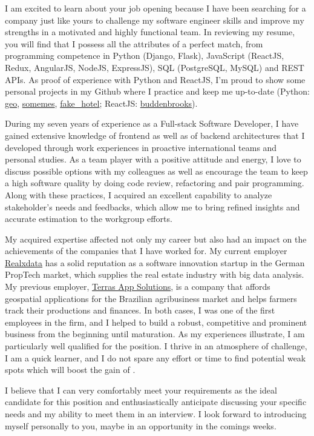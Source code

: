 I am excited to learn about your job opening because I have been searching for a
company just like yours to challenge my software engineer skills and improve my
strengths in a motivated and highly functional team. In reviewing my resume,
you will find that I possess all the attributes of a perfect match, from programming
competence in Python (Django, Flask), JavaScript (ReactJS, Redux, AngularJS, NodeJS, ExpressJS), SQL
(PostgreSQL, MySQL) and REST APIs. As proof of experience with Python and ReactJS,
I'm proud to show some personal projects in my Github where I practice and keep
me up-to-date (Python: \href{https://github.com/joaosr/geo}{geo}, \href{https://github.com/joaosr/somemes/tree/target}{somemes},
\href{https://github.com/joaosr/fake_hotel}{fake\_hotel}; ReactJS: \href{https://github.com/joaosr/buddenbrooks}{buddenbrooks}).

During my seven years of experience as a Full-stack Software Developer, I have
gained extensive knowledge of frontend as well as of backend architectures that
I developed through work experiences in proactive international teams and personal
studies. As a team player with a positive attitude and energy, I love to discuss
possible options with my colleagues as well as encourage the team to keep a high
software quality by doing code review, refactoring and pair programming. Along
with these practices, I acquired an excellent capability to analyze stakeholder's
needs and feedbacks, which allow me to bring refined insights and accurate estimation
to the workgroup efforts.

My acquired expertise affected not only my career but also had an impact on the
achievements of the companies that I have worked for. My current employer
\href{https://www.realxdata.com/}{Realxdata} has a solid reputation as a software
innovation startup in the German PropTech market, which supplies the real estate
industry with big data analysis. My previous employer, \href{http://terras.agr.br/}{Terras App Solutions},
is a company that affords geospatial applications for the Brazilian agribusiness
market and helps farmers track their productions and finances. In both cases,
I was one of the first employees in the firm, and I helped to build a robust,
competitive and prominent business from the beginning until maturation. As my
experiences illustrate, I am particularly well qualified for the position.
I thrive in an atmosphere of challenge, I am a quick learner, and I do not spare
any effort or time to find potential weak spots which will boost the gain of \companyName.

I believe that I can very comfortably meet your requirements as the ideal candidate
for this position and enthusiastically anticipate discussing your specific needs
and my ability to meet them in an interview. I look forward to introducing myself
personally to you, maybe in an opportunity in the comings weeks.

